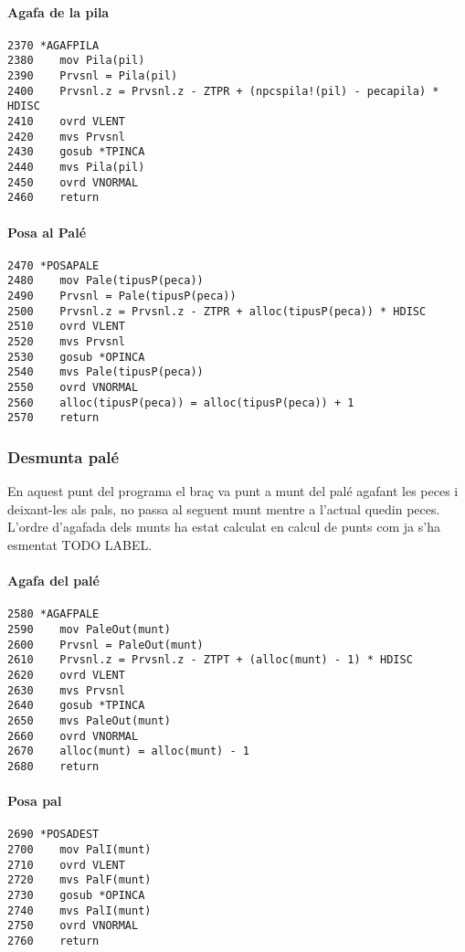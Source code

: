 \paragraph{Agafa de la pila}
\begin{verbatim}
2370 *AGAFPILA
2380    mov Pila(pil)
2390    Prvsnl = Pila(pil)
2400    Prvsnl.z = Prvsnl.z - ZTPR + (npcspila!(pil) - pecapila) * HDISC
2410    ovrd VLENT
2420    mvs Prvsnl
2430    gosub *TPINCA
2440    mvs Pila(pil)
2450    ovrd VNORMAL
2460    return
\end{verbatim}

\paragraph{Posa al Palé}
\begin{verbatim}
2470 *POSAPALE
2480    mov Pale(tipusP(peca))
2490    Prvsnl = Pale(tipusP(peca))
2500    Prvsnl.z = Prvsnl.z - ZTPR + alloc(tipusP(peca)) * HDISC
2510    ovrd VLENT
2520    mvs Prvsnl
2530    gosub *OPINCA
2540    mvs Pale(tipusP(peca))
2550    ovrd VNORMAL
2560    alloc(tipusP(peca)) = alloc(tipusP(peca)) + 1
2570    return
\end{verbatim}

\subsubsection{Desmunta palé}
En aquest punt del programa el braç va punt a munt del palé agafant les peces
i deixant-les als pals, no passa al seguent munt mentre a l'actual quedin peces.
L'ordre d'agafada dels munts ha estat calculat en calcul de punts com ja s'ha
esmentat TODO LABEL.

\paragraph{Agafa del palé}
\begin{verbatim}
2580 *AGAFPALE
2590    mov PaleOut(munt)
2600    Prvsnl = PaleOut(munt)
2610    Prvsnl.z = Prvsnl.z - ZTPT + (alloc(munt) - 1) * HDISC
2620    ovrd VLENT
2630    mvs Prvsnl
2640    gosub *TPINCA
2650    mvs PaleOut(munt)
2660    ovrd VNORMAL
2670    alloc(munt) = alloc(munt) - 1
2680    return
\end{verbatim}


\paragraph{Posa pal}
\begin{verbatim}
2690 *POSADEST
2700    mov PalI(munt)
2710    ovrd VLENT
2720    mvs PalF(munt)
2730    gosub *OPINCA
2740    mvs PalI(munt)
2750    ovrd VNORMAL
2760 	return
\end{verbatim}

